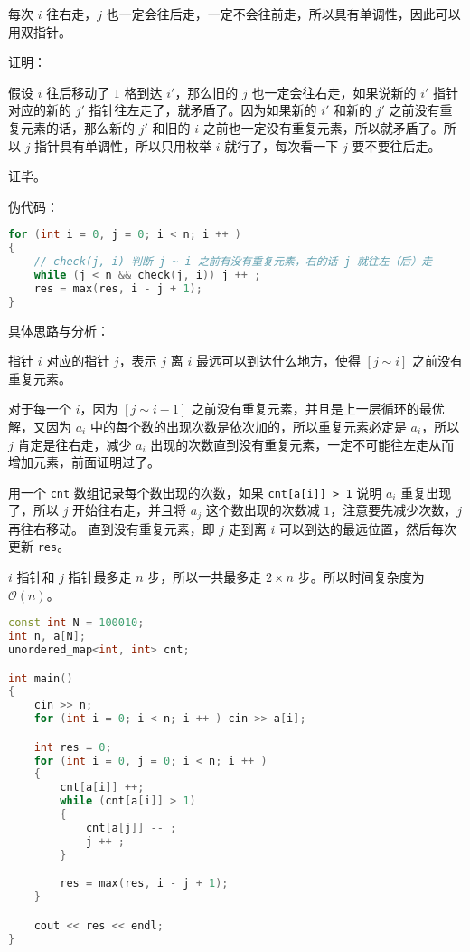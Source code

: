 每次 $i$ 往右走，$j$ 也一定会往后走，一定不会往前走，所以具有单调性，因此可以用双指针。

证明：

假设 $i$ 往后移动了 $1$ 格到达 $i'$，那么旧的 $j$ 也一定会往右走，如果说新的 $i'$ 指针对应的新的 $j'$ 指针往左走了，就矛盾了。因为如果新的 $i'$ 和新的 $j'$ 之前没有重复元素的话，那么新的 $j'$ 和旧的 $i$ 之前也一定没有重复元素，所以就矛盾了。所以 $j$ 指针具有单调性，所以只用枚举 $i$ 就行了，每次看一下 $j$ 要不要往后走。

证毕。

伪代码：

\begin{lstlisting}[language=cpp]
for (int i = 0, j = 0; i < n; i ++ )
{
    // check(j, i) 判断 j ~ i 之前有没有重复元素，右的话 j 就往左（后）走
    while (j < n && check(j, i)) j ++ ;    
    res = max(res, i - j + 1);
}
\end{lstlisting}

具体思路与分析：

指针 $i$ 对应的指针 $j$，表示 $j$ 离 $i$ 最远可以到达什么地方，使得 $[j \sim i]$ 之前没有重复元素。

对于每一个 $i$，因为 $[j \sim i - 1]$ 之前没有重复元素，并且是上一层循环的最优解，又因为 $a_i$ 中的每个数的出现次数是依次加的，所以重复元素必定是 $a_i$，所以 $j$ 肯定是往右走，减少 $a_i$ 出现的次数直到没有重复元素，一定不可能往左走从而增加元素，前面证明过了。

用一个 \verb`cnt` 数组记录每个数出现的次数，如果 \verb`cnt[a[i]] > 1` 说明 $a_i$ 重复出现了，所以 $j$ 开始往右走，并且将 $a_j$ 这个数出现的次数减 $1$，注意要先减少次数，$j$ 再往右移动。 直到没有重复元素，即 $j$ 走到离 $i$ 可以到达的最远位置，然后每次更新 \verb`res`。

$i$ 指针和 $j$ 指针最多走 $n$ 步，所以一共最多走 $2 \times n$ 步。所以时间复杂度为 $\mathcal{O}(n)$。

\begin{lstlisting}[language=cpp]
const int N = 100010;
int n, a[N];
unordered_map<int, int> cnt;

int main() 
{
    cin >> n;
    for (int i = 0; i < n; i ++ ) cin >> a[i];

    int res = 0;
    for (int i = 0, j = 0; i < n; i ++ )
    {
        cnt[a[i]] ++;
        while (cnt[a[i]] > 1)
        {
            cnt[a[j]] -- ;
            j ++ ;
        }

        res = max(res, i - j + 1);
    }

    cout << res << endl;
}
\end{lstlisting}

